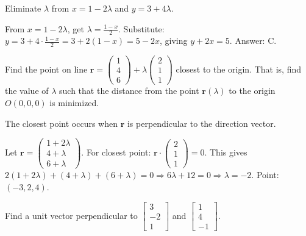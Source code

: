 \begin{hint}
Eliminate $\lambda$ from $x = 1 - 2\lambda$ and $y = 3 + 4\lambda$.
\end{hint}

\begin{solution}[Sketch]
From $x = 1 - 2\lambda$, get $\lambda = \frac{1-x}{2}$. Substitute: $y = 3 + 4 \cdot \frac{1-x}{2} = 3 + 2(1-x) = 5 - 2x$, giving $y + 2x = 5$. Answer: C.
\end{solution}

\vspace{1em}

\begin{problem}
Find the point on line $\mathbf{r} = \begin{pmatrix} 1 \\ 4 \\ 6 \end{pmatrix} + \lambda \begin{pmatrix} 2 \\ 1 \\ 1 \end{pmatrix}$ closest to the origin. That is, find the value of $\lambda$ such that the distance from the point $\mathbf{r}(\lambda)$ to the origin $O(0, 0, 0)$ is minimized.
\end{problem}

\begin{hint}
The closest point occurs when $\mathbf{r}$ is perpendicular to the direction vector.
\end{hint}

\begin{solution}[Sketch]
Let $\mathbf{r} = \begin{pmatrix} 1 + 2\lambda \\ 4 + \lambda \\ 6 + \lambda \end{pmatrix}$. For closest point: $\mathbf{r} \cdot \begin{pmatrix} 2 \\ 1 \\ 1 \end{pmatrix} = 0$. This gives $2(1+2\lambda) + (4+\lambda) + (6+\lambda) = 0 \Rightarrow 6\lambda + 12 = 0 \Rightarrow \lambda = -2$. Point: $(-3, 2, 4)$.
\end{solution}

\vspace{1em}

\begin{problem}
Find a unit vector perpendicular to $\begin{bmatrix} 3 \\ -2 \\ 1 \end{bmatrix}$ and $\begin{bmatrix} 1 \\ 4 \\ -1 \end{bmatrix}$.
\end{problem}

